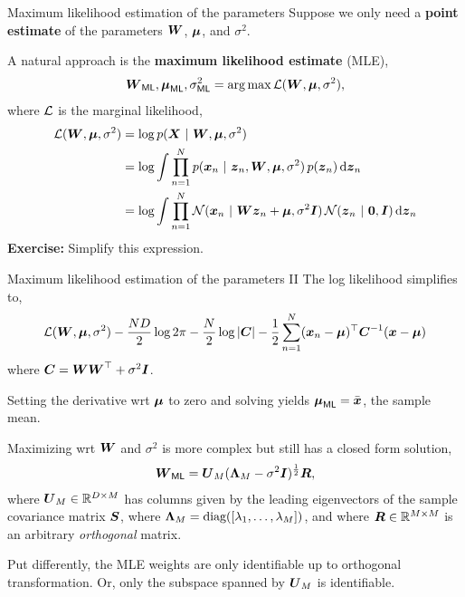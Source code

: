 \documentclass[aspectratio=169]{beamer}
\begin{document}
\begin{frame}[t]{Maximum likelihood estimation of the parameters}
    Suppose we only need a \textbf{point estimate} of the parameters $\boldsymbol{W}$, $\boldsymbol{\mu}$, and $\sigma^2$. 
    
    A natural approach is the \textbf{maximum likelihood estimate} (MLE), 
    \begin{align}
        \boldsymbol{W}_{\mathsf{ML}}, \boldsymbol{\mu}_{\mathsf{ML}}, \sigma^2_{\mathsf{ML}} = \operatorname*{arg\,max} \mathcal{L}(\boldsymbol{W}, \boldsymbol{\mu}, \sigma^2),
    \end{align}
    where $\mathcal{L}$ is the marginal likelihood,
    \begin{align}
        \mathcal{L}(\boldsymbol{W}, \boldsymbol{\mu}, \sigma^2) &= \log p(\boldsymbol{X} ~\vert~ \boldsymbol{W}, \boldsymbol{\mu}, \sigma^2) \\
        &= \log \int \prod_{n=1}^N p(\boldsymbol{x}_n ~\vert~ \boldsymbol{z}_n, \boldsymbol{W}, \boldsymbol{\mu}, \sigma^2) \, p(\boldsymbol{z}_n) \mathop{}\!\mathrm{d} \boldsymbol{z}_n \\
        &= \log \int \prod_{n=1}^N \mathcal{N}(\boldsymbol{x}_n ~\vert~ \boldsymbol{W} \boldsymbol{z}_n + \boldsymbol{\mu}, \sigma^2 \boldsymbol{I}) \, \mathcal{N}(\boldsymbol{z}_n ~\vert~ \boldsymbol{0}, \boldsymbol{I}) \mathop{}\!\mathrm{d} \boldsymbol{z}_n 
    \end{align}
    \textbf{Exercise: } Simplify this expression.
\end{frame}

\begin{frame}[t]{Maximum likelihood estimation of the parameters II}
    The log likelihood simplifies to,
    \begin{align}
        \mathcal{L}(\boldsymbol{W}, \boldsymbol{\mu}, \sigma^2) 
        -\frac{ND}{2} \log 2 \pi - \frac{N}{2} \log |\boldsymbol{C}| -\frac{1}{2} \sum_{n=1}^N (\boldsymbol{x}_n - \boldsymbol{\mu})^\top \boldsymbol{C}^{-1} (\boldsymbol{x} - \boldsymbol{\mu}) 
    \end{align}
    where $\boldsymbol{C} = \boldsymbol{W} \boldsymbol{W}^\top + \sigma^2 \boldsymbol{I}$. 
    
    Setting the derivative wrt $\boldsymbol{\mu}$ to zero and solving yields $\boldsymbol{\mu}_{\mathsf{ML}} = \bar{\boldsymbol{x}}$, the sample mean.
    
    Maximizing wrt $\boldsymbol{W}$ and $\sigma^2$ is more complex but still has a closed form solution,
    \begin{align}
        \boldsymbol{W}_{\mathsf{ML}} = \boldsymbol{U}_M (\boldsymbol{\Lambda}_M - \sigma^2 \boldsymbol{I})^{\frac{1}{2}} \boldsymbol{R},
    \end{align}
    where $\boldsymbol{U}_M \in \mathbb{R}^{D \times M}$ has columns given by the leading eigenvectors of the sample covariance matrix $\boldsymbol{S}$, where $\boldsymbol{\Lambda}_M = \textrm{diag}([\lambda_1, \ldots, \lambda_M])$, and where $\boldsymbol{R} \in \mathbb{R}^{M \times M}$ is an arbitrary \textit{orthogonal} matrix.
    
    Put differently, the MLE weights are only identifiable up to orthogonal transformation. Or, only the subspace spanned by $\boldsymbol{U}_M$ is identifiable.
\end{frame}
\end{document}
